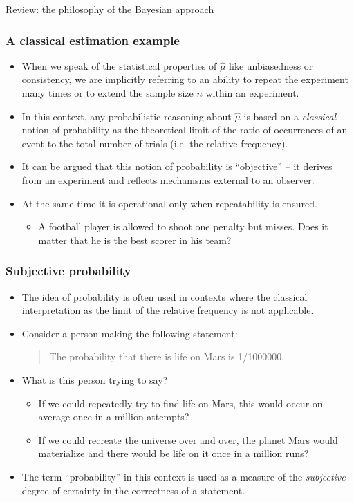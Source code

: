 \documentclass[10pt]{beamer}
\theoremstyle{definition}
\begin{document}
\begin{section}{Review: the philosophy of the Bayesian approach}
\begin{frame}
\frametitle{A classical estimation example}
\begin{itemize}\itemsep1em
\item When we speak of the statistical properties of $\hat{\mu}$ like unbiasedness or consistency, we are implicitly referring to an ability to repeat the experiment many times or to extend the sample size $ n $ within an experiment.
\item In this context, any probabilistic reasoning about $\hat{\mu}$ is based on a \emph{classical} notion of probability as the theoretical limit of the ratio of occurrences of an event to the total number of trials (i.e. the relative frequency).
\item It can be argued that this notion of probability is ``objective'' -- it derives from an experiment and reflects mechanisms external to an observer.
\item At the same time it is operational only when repeatability is ensured.
	\begin{itemize}\itemsep1em
	\item A football player is allowed to shoot one penalty but misses. Does it matter that he is the best scorer in his team?
	\end{itemize}
\end{itemize}
\end{frame}

\begin{frame}
\frametitle{Subjective probability}
\begin{itemize}\itemsep1em
\item The idea of probability is often used in contexts where the classical interpretation as the limit of the relative frequency is not applicable.
\item Consider a person making the following statement: 
\begin{quote}
The probability that there is life on Mars is 1/1000000.
\end{quote}
\item What is this person trying to say?
	\begin{itemize}\itemsep1em
	\item If we could repeatedly try to find life on Mars, this would occur on average once in a million attempts?
	\item If we could recreate the universe over and over, the planet Mars would materialize and there would be life on it once in a million runs?
	\end{itemize}
\item \alert{The term ``probability'' in this context is used as a measure of the \emph{subjective} degree of certainty in the correctness of a statement.}
\end{itemize}
\end{frame}


\end{section}
\end{document}
